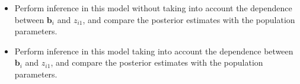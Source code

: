 \begin{enumerate}
	\begin{itemize}
		\item Perform inference in this model without taking into account the dependence between $\bm{b}_i$ and $z_{i1}$, and compare the posterior estimates with the population parameters.
		\item Perform inference in this model taking into account the dependence between $\bm{b}_i$ and $z_{i1}$, and compare the posterior estimates with the population parameters. 
	\end{itemize}
	
	
	
\end{enumerate}
